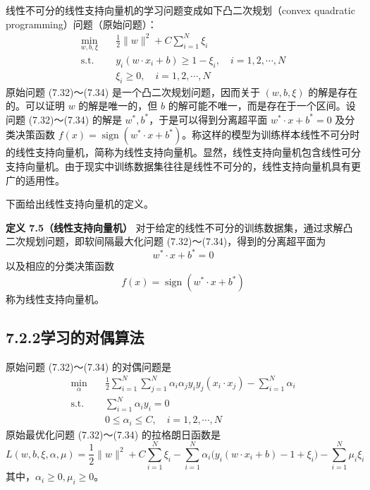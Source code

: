 \documentclass[UTF8,12pt,a4paper,fontset=fandol]{ctexart}
\begin{document}
线性不可分的线性支持向量机的学习问题变成如下凸二次规划（convex quadratic programming）问题（原始问题）：
\begin{equation}
\begin{aligned}
\min_{w,b,\xi}\quad & \frac{1}{2}\|w\|^2+C\sum_{i=1}^N\xi_i\\
\mathrm{s.t.}\quad & y_i(w\cdot x_i+b)\geq 1-\xi_i,\quad i=1,2,\cdots,N\\
& \xi_i\geq 0,\quad i=1,2,\cdots,N
\end{aligned}
\tag{7.32--7.34}
\end{equation}
原始问题 (7.32)～(7.34) 是一个凸二次规划问题，因而关于 $(w,b,\xi)$ 的解是存在的。可以证明 $w$ 的解是唯一的，但 $b$ 的解可能不唯一，而是存在于一个区间。设问题 (7.32)～(7.34) 的解是 $w^*,b^*$，于是可以得到分离超平面 $w^*\cdot x+b^*=0$ 及分类决策函数 $f(x)=\operatorname{sign}(w^*\cdot x+b^*)$。称这样的模型为训练样本线性不可分时的线性支持向量机，简称为线性支持向量机。显然，线性支持向量机包含线性可分支持向量机。由于现实中训练数据集往往是线性不可分的，线性支持向量机具有更广的适用性。

下面给出线性支持向量机的定义。

\noindent\textbf{定义 7.5（线性支持向量机）}\quad
对于给定的线性不可分的训练数据集，通过求解凸二次规划问题，即软间隔最大化问题 (7.32)～(7.34)，得到的分离超平面为
\begin{equation}
w^*\cdot x+b^*=0
\tag{7.35}
\end{equation}
以及相应的分类决策函数
\begin{equation}
f(x)=\operatorname{sign}(w^*\cdot x+b^*)
\tag{7.36}
\end{equation}
称为线性支持向量机。

\subsection*{7.2.2\quad 学习的对偶算法}

原始问题 (7.32)～(7.34) 的对偶问题是
\begin{equation}
\begin{aligned}
\min_\alpha\quad & \frac{1}{2}\sum_{i=1}^N\sum_{j=1}^N\alpha_i\alpha_j y_i y_j(x_i\cdot x_j)-\sum_{i=1}^N\alpha_i\\
\mathrm{s.t.}\quad & \sum_{i=1}^N\alpha_i y_i=0\\
& 0\leq \alpha_i\leq C,\quad i=1,2,\cdots,N
\end{aligned}
\tag{7.37--7.39}
\end{equation}
原始最优化问题 (7.32)～(7.34) 的拉格朗日函数是
\begin{equation}
L(w,b,\xi,\alpha,\mu)=\frac{1}{2}\|w\|^2+C\sum_{i=1}^N\xi_i-\sum_{i=1}^N\alpha_i\bigl(y_i(w\cdot x_i+b)-1+\xi_i\bigr)-\sum_{i=1}^N\mu_i\xi_i
\tag{7.40}
\end{equation}
其中，$\alpha_i\geq 0,\mu_i\geq 0$。
\end{document}
